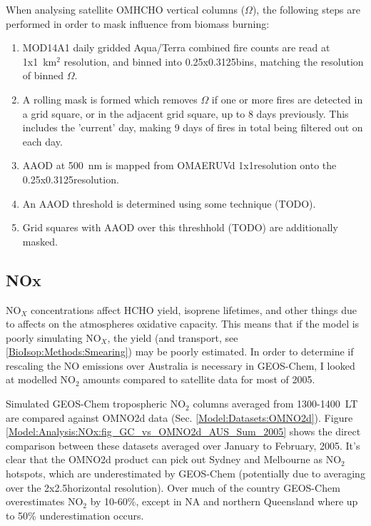     When analysing satellite OMHCHO vertical columns ($\Omega$), the following steps are performed in order to mask influence from biomass burning:
    \begin{enumerate}
      \item MOD14A1 daily gridded Aqua/Terra combined fire counts are read at 1x1~km$^2$ resolution, and binned into 0.25x0.3125\degr bins, matching the resolution of binned $\Omega$.
      \item A rolling mask is formed which removes $\Omega$ if one or more fires are detected in a grid square, or in the adjacent grid square, up to 8 days previously.
      This includes the 'current' day, making 9 days of fires in total being filtered out on each day.
      \item AAOD at 500~nm is mapped from OMAERUVd 1x1\degr resolution onto the 0.25x0.3125\degr resolution.
      \item An AAOD threshold is determined using some technique (TODO).
      \item Grid squares with AAOD over this threshhold (TODO) are additionally masked.
    \end{enumerate}
    
  
  
  \subsection{NOx}
    \label{Model:Filter:NOx}

    NO$_X$ concentrations affect HCHO yield, isoprene lifetimes, and other things due to affects on the atmospheres oxidative capacity.
    This means that if the model is poorly simulating NO$_X$, the yield (and transport, see \ref{BioIsop:Methods:Smearing}) may be poorly estimated.
    In order to determine if rescaling the NO emissions over Australia is necessary in GEOS-Chem, I looked at modelled NO$_2$ amounts compared to satellite data for most of 2005.
    
    
    Simulated GEOS-Chem tropospheric NO$_2$ columns averaged from 1300-1400~LT are compared against OMNO2d data (Sec. \ref{Model:Datasets:OMNO2d}). 
    Figure \ref{Model:Analysis:NOx:fig_GC_vs_OMNO2d_AUS_Sum_2005} shows the direct comparison between these datasets averaged over January to February, 2005.
    It's clear that the OMNO2d product can pick out Sydney and Melbourne as NO$_2$ hotspots, which are underestimated by GEOS-Chem (potentially due to averaging over the 2x2.5\degr horizontal resolution).
    Over much of the country GEOS-Chem overestimates NO$_2$ by 10-60\%, except in NA and northern Queensland where up to 50\% underestimation occurs.

